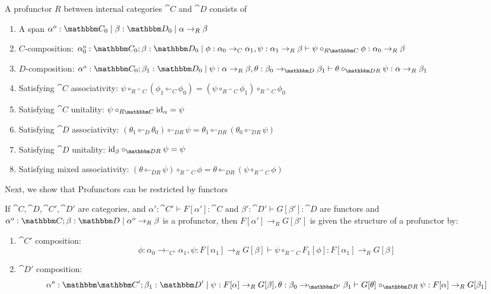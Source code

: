 \documentclass{article}
\begin{document}
\begin{definition}
  A profunctor $R$ between internal categories $\cat C$ and $\cat D$
  consists of
  \begin{enumerate}
  \item A span $\alpha^o : \cat C_0\pipe \beta : \cat D_0 \pipe \alpha \to_{R} \beta$
  \item $C$-composition: $\alpha_0^o:\cat C_0;\beta : \cat D_0\pipe \phi : \alpha_0 \to_{C} \alpha_1, \psi : \alpha_1 \to_{R} \beta \vdash \psi \circ_{R\cat C} \phi : \alpha_0 \to_{R} \beta$
  \item $D$-composition: $\alpha^o:\cat C_0;\beta_1 : \cat D_0\pipe \psi : \alpha \to_{R} \beta, \theta : \beta_0 \to_{\cat D} \beta_1 \vdash \theta \circ_{\cat DR} \psi : \alpha \to_{R} \beta_1$
  \item Satisfying $\cat C$ associativity: $\psi \circ_{R\cat C} (\phi_1 \circ_{\cat C} \phi_0) = (\psi \circ_{R\cat C} \phi_1) \circ_{R\cat C} \phi_0$
  \item Satisfying $\cat C$ unitality: $\psi \circ_{R\cat C} \id_{\alpha} = \psi$
  \item Satisfying $\cat D$ associativity: $(\theta_1 \circ_{\cat D} \theta_0) \circ_{\cat DR} \psi = \theta_1 \circ_{\cat D R} (\theta_0 \circ_{\cat DR} \psi)$
  \item Satisfying $\cat D$ unitality: $\id_{\beta} \circ_{\cat D R} \psi = \psi$
  \item Satisfying mixed associativity: $(\theta \circ_{\cat D R} \psi) \circ_{R \cat C} \phi = \theta \circ_{\cat D R} (\psi \circ_{R \cat C} \phi)$
  \end{enumerate}
\end{definition}

Next, we show that Profunctors can be restricted by functors

\begin{definition}
  If $\cat C, \cat D, \cat C', \cat D'$ are categories, and $\alpha' :
  \cat C' \vdash F[\alpha'] : \cat C$ and $\beta' : \cat D' \vdash
  G[\beta'] : \cat D$ are functors and $\alpha^o : \cat C;\beta : \cat
  D \pipe \alpha^o \to_{R} \beta$ is a profunctor, then $F[\alpha']
  \to_{R} G[\beta']$ is given the structure of a profunctor by:
  \begin{enumerate}
  \item $\cat C'$ composition:
    \[ \phi : \alpha_0 \to_{\cat C'} \alpha_1, \psi : F[\alpha_1] \to_{R} G[\beta] \vdash \psi \circ_{R\cat C} F_1[\phi] : F[\alpha_1] \to_{R} G[\beta]
    \]
  \item $\cat D'$ composition:
    \[ \alpha^o:\cat \cat C';\beta_1 : \cat D'\pipe \psi : F[\alpha] \to_{R} G[\beta], \theta : \beta_0 \to_{\cat D'} \beta_1 \vdash G[\theta] \circ_{\cat DR} \psi : F[\alpha] \to_{R} G[\beta_1] \]
  \end{enumerate}
\end{definition}
\end{document}
